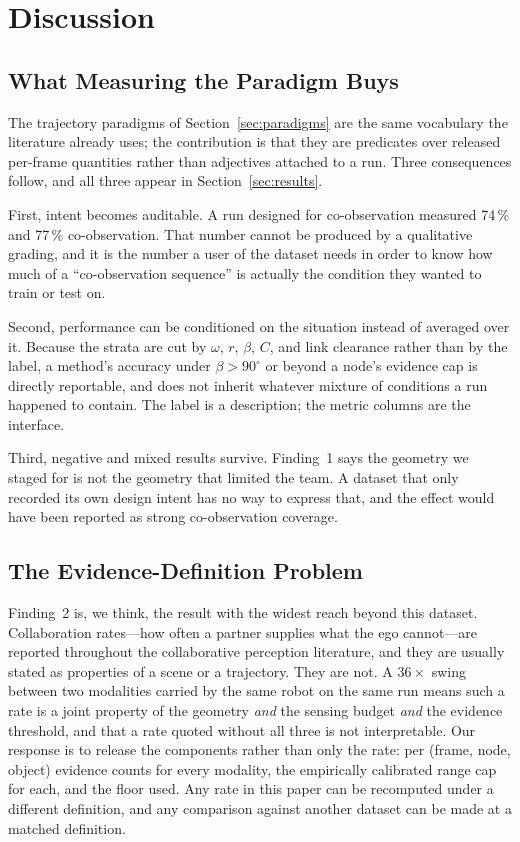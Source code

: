 \section{Discussion}
\label{sec:discussion}

\subsection{What Measuring the Paradigm Buys}

The trajectory paradigms of Section~\ref{sec:paradigms} are the same
vocabulary the literature already uses; the contribution is that they are
predicates over released per-frame quantities rather than adjectives attached
to a run. Three consequences follow, and all three appear in
Section~\ref{sec:results}.

First, intent becomes auditable. A run designed for co-observation measured
74\,\% and 77\,\% co-observation. That number cannot be produced by a
qualitative grading, and it is the number a user of the dataset needs in order
to know how much of a ``co-observation sequence'' is actually the condition
they wanted to train or test on.

Second, performance can be conditioned on the situation instead of averaged
over it. Because the strata are cut by $\omega$, $r$, $\beta$, $C$, and link
clearance rather than by the label, a method's accuracy under
$\beta > 90^\circ$ or beyond a node's evidence cap is directly reportable, and
does not inherit whatever mixture of conditions a run happened to contain. The
label is a description; the metric columns are the interface.

Third, negative and mixed results survive. Finding~1 says the geometry we
staged for is not the geometry that limited the team. A dataset that only
recorded its own design intent has no way to express that, and the effect would
have been reported as strong co-observation coverage.

\subsection{The Evidence-Definition Problem}

Finding~2 is, we think, the result with the widest reach beyond this dataset.
Collaboration rates---how often a partner supplies what the ego cannot---are
reported throughout the collaborative perception literature, and they are
usually stated as properties of a scene or a trajectory. They are not. A
$36\times$ swing between two modalities carried by the same robot on the same
run means such a rate is a joint property of the geometry \emph{and} the
sensing budget \emph{and} the evidence threshold, and that a rate quoted without
all three is not interpretable. Our response is to release the components
rather than only the rate: per (frame, node, object) evidence counts for every
modality, the empirically calibrated range cap for each, and the floor used.
Any rate in this paper can be recomputed under a different definition, and any
comparison against another dataset can be made at a matched definition.

